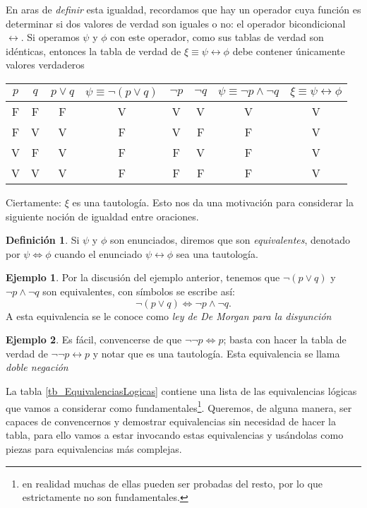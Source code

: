 \documentclass{book}
\theoremstyle{definition}
\newtheorem{df}{Definición}[chapter]
\newtheorem{ejm}{Ejemplo}[chapter]
\begin{document}
En aras de \emph{definir} esta igualdad,  recordamos que hay un operador cuya función es determinar si dos valores de verdad son iguales o no: el operador bicondicional $\leftrightarrow$.
Si operamos $\psi$ y $\phi$ con este operador, como sus tablas de verdad son idénticas, entonces la tabla de verdad de $\xi \equiv \psi \leftrightarrow \phi$ debe contener únicamente valores verdaderos %
\begin{center}\begin{tabular}{|c|c||c|c|c|c|c|c|}
		\hline
		$p$ & $q$ & $p\vee q$ & $\psi \equiv \neg (p \vee q)$ & $\neg p$ & $\neg q$ & $\psi \equiv \neg p \wedge \neg q$ & $\xi \equiv \psi \leftrightarrow \phi$ \\
		\hline\hline
		F & F & F & V & V & V & V & V \\ \hline
		F & V & V & F & V & F & F & V \\ \hline
		V & F & V & F & F & V & F & V \\ \hline
		V & V & V & F & F & F & F & V \\ \hline
\end{tabular}\end{center}

Ciertamente: $\xi$ es una tautología. Esto nos da una motivación para considerar la siguiente noción de igualdad entre oraciones.
\begin{df}\label{df_equivalenciaLogica}
	Si $\psi$ y $\phi$ son enunciados, diremos que son \emph{equivalentes}, denotado por $\psi \iff \phi$ cuando el enunciado $\psi \leftrightarrow \phi$ sea una tautología.
\end{df}

\begin{ejm}
	Por la discusión del ejemplo anterior, tenemos que $\neg (p \vee q)$ y $\neg p \wedge \neg q$ son equivalentes, con símbolos se escribe así: \[\neg (p \vee q) \iff \neg p \wedge \neg q.\]
	A esta equivalencia se le conoce como \emph{ley de De Morgan para la disyunción}
\end{ejm}

\begin{ejm}
	Es fácil, convencerse de que $\neg \neg p \iff p$; basta con hacer la tabla de verdad de $\neg \neg p \leftrightarrow p$ y notar que es una tautología. Esta equivalencia se llama \emph{doble negación}
\end{ejm}

La tabla \ref{tb_EquivalenciasLogicas} contiene una lista de las equivalencias lógicas que vamos a considerar como fundamentales\footnote{en realidad muchas de ellas pueden ser probadas del resto, por lo que estrictamente no son fundamentales.}.
Queremos, de alguna manera, ser capaces de convencernos y demostrar equivalencias sin necesidad de hacer la tabla, para ello vamos a estar invocando estas equivalencias y usándolas como piezas para equivalencias más complejas.
\end{document}
